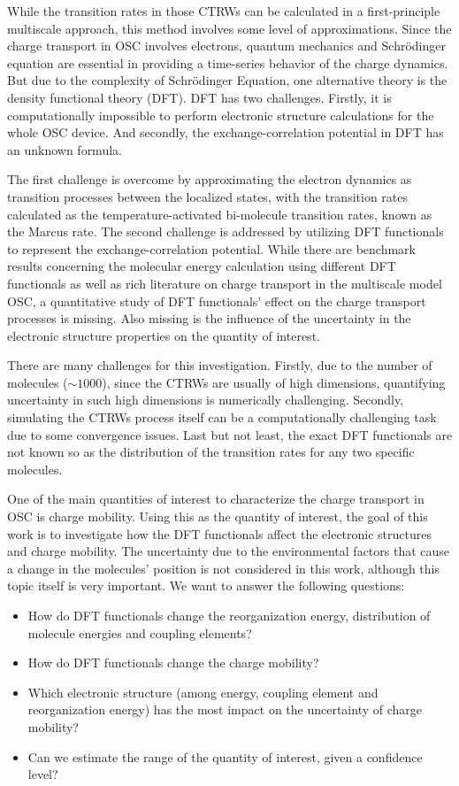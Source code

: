\documentclass[letterpaper,12pt]{article}
\begin{document}
While the transition rates in those CTRWs can be calculated in a first-principle multiscale approach, this method involves some level of approximations. 
Since the charge transport in OSC involves electrons, quantum mechanics and Schr\"odinger equation are essential in providing a time-series behavior of the charge dynamics. 
But due to the complexity of Schr\"odinger Equation, one alternative theory is the density functional theory (DFT). DFT has two challenges. Firstly, it is computationally impossible to perform electronic structure calculations for the whole OSC device. And secondly, the exchange-correlation potential in DFT has an unknown formula.

The first challenge is overcome by approximating the electron dynamics as transition processes between the localized states, with the transition rates calculated as the temperature-activated bi-molecule transition rates, known as the Marcus rate. 
The second challenge is addressed by utilizing DFT functionals to represent the exchange-correlation potential. 
While there are benchmark results concerning the molecular energy calculation using different DFT functionals as well as rich literature on charge transport in the multiscale model OSC, a quantitative study of DFT functionals' effect on the charge transport processes is missing. 
Also missing is the influence of the uncertainty in the electronic structure properties on the quantity of interest. 

There are many challenges for this investigation. Firstly, due to the number of molecules ($\sim 1000$), since the CTRWs are usually of high dimensions, quantifying uncertainty in such high dimensions is numerically challenging. Secondly, simulating the CTRWs process itself can be a computationally challenging task due to some convergence issues.
Last but not least, the exact DFT functionals are not known so as the distribution of the transition rates for any two specific molecules. 

One of the main quantities of interest to characterize the charge transport in OSC is charge mobility. Using this as the quantity of interest,
the goal of this work is to investigate how the DFT functionals affect the electronic structures and charge mobility. The uncertainty due to the environmental factors that cause a change in the molecules' position is not considered in this work, although this topic itself is very important.
We want to answer the following questions: 
\begin{itemize}
    \item How do DFT functionals change the reorganization energy, distribution of molecule energies and coupling elements? 
    \item How do DFT functionals change the charge mobility?
    \item Which electronic structure (among energy, coupling element and reorganization energy) has the most impact on the uncertainty of charge mobility?
    \item Can we estimate the range of the quantity of interest, given a confidence level?
\end{itemize}
\end{document}
